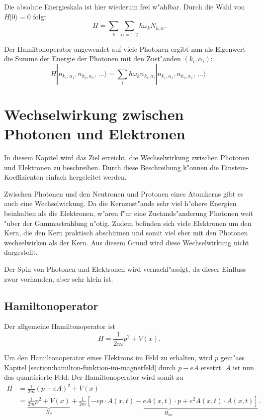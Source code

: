 \begin{refsection}
Die absolute Energieskala ist hier wiederum frei w"ahlbar. Durch die Wahl von $H|0\rangle = 0$ folgt
\begin{equation*}
H = \sum_k \sum_{\alpha=1,2} \hbar \omega_k N_{k,\alpha}.
\end{equation*}

Der Hamiltonoperator angewendet auf viele Photonen ergibt nun als Eigenwert die Summe der Energie der Photonen mit den Zust"anden $(k_i,\alpha_i)$:
\begin{equation*}
H |n_{k_1,\alpha_1}, n_{k_2,\alpha_2}, \, \hdots\rangle = \sum_i \hbar \omega_k n_{k_i,\alpha_i} |n_{k_1,\alpha_1}, n_{k_2,\alpha_2}, \, \hdots\rangle.
\end{equation*}

\section{Wechselwirkung zwischen Photonen und Elektronen}

In diesem Kapitel wird das Ziel erreicht, die Wechselwirkung zwischen Photonen und Elektronen zu beschreiben. Durch diese Beschreibung k"onnen die Einstein-Koeffizienten einfach hergeleitet werden.

Zwischen Photonen und den Neutronen und Protonen eines Atomkerns gibt es auch eine Wechselwirkung. Da die Kernzust"ande sehr viel h"ohere Energien beinhalten als die Elektronen, w"aren f"ur eine Zustands"anderung Photonen weit "uber der Gammastrahlung n"otig. Zudem befinden sich viele Elektronen um den Kern, die den Kern praktisch abschirmen und somit viel eher mit den Photonen wechselwirken als der Kern. Aus diesem Grund wird diese Wechselwirkung nicht dargestellt.

Der Spin von Photonen und Elektronen wird vernachl"assigt, da dieser Einfluss zwar vorhanden, aber sehr klein ist.

\subsection{Hamiltonoperator}

Der allgemeine Hamiltonoperator ist
\begin{equation*}
H = \frac{1}{2m}p^2 + V(x).
\end{equation*}

Um den Hamiltonoperator eines Elektrons im Feld zu erhalten, wird $p$ gem"ass Kapitel \ref{section:hamilton-funktion-im-magnetfeld} durch $p - eA$ ersetzt. $A$ ist nun das quantisierte Feld. Der Hamiltonoperator wird somit zu
\begin{equation*}
\begin{split}
H &= \frac{1}{2m}(p - eA)^2 + V(x)\\
 &= \underbrace{\frac{1}{2m}p^2 + V(x)}_{H_0} + \underbrace{\frac{1}{2m}\left[- e p \cdot A(x, t) - e A(x, t) \cdot p + e^2 A(x, t) \cdot A(x, t) \right]}_{H_{\text{int}}}.
\end{split}
\end{equation*}


\end{refsection}
